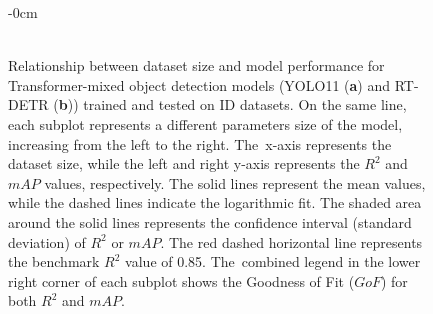 \documentclass[12pt,a4paper,oneside]{report}
\newlength{\extralength}
\begin{document}
\begin{landscape}
\begin{figure}
 \begin{adjustwidth}{-\extralength}{0cm}
  \centering
  \\
  \\
\end{adjustwidth}
 \caption{Relationship between dataset size and model performance 
  for Transformer-mixed object detection models (YOLO11 (\textbf{a}) and RT-DETR (\textbf{b})) trained and tested on ID datasets. 
  On the same line, each subplot represents a different parameters size of the model,
  increasing from the left to the right. The~x-axis represents the dataset size, while
  the left and right y-axis represents the $R^2$ and $mAP$ values, respectively. 
  The solid lines represent the mean values, while the dashed lines indicate the logarithmic fit.
  The shaded area around the solid lines represents the confidence interval (standard
  deviation) of $R^2$ or $mAP$.
  The red dashed horizontal line represents the benchmark $R^2$ value of 0.85. The~combined
  legend in the lower right corner of each subplot shows the Goodness of Fit ($GoF$) for both $R^2$
  and $mAP$.}
  \label{fig:dataset_size_vs_performance_transformer}
\end{figure}
\end{landscape}
\end{document}
